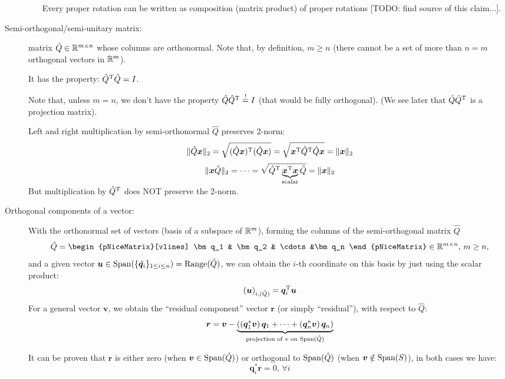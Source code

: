 \documentclass[
  12pt,
  paper=a4,
]{scrartcl} %
\begin{document}
\begin{description}
\begin{itemize}
    Every proper rotation can be written as composition (matrix product) of proper rotations [TODO: find source of this claim...].

\end{itemize}

\item[Semi-orthogonal/semi-unitary matrix:] matrix $\hat Q \in \mathbb R^{m\times n}$ whose columns are orthonormal. Note that, by definition, $m \ge n$ (there cannot be a set of more than $n=m$ orthogonal vectors in $\mathbb R^m$).

It has the property: $\hat Q^{\mathrm{T}} \hat Q = I$.

Note that, unless $m=n$, we don't have the property $\hat Q \hat Q^{\mathrm{T}}  \overset{!}{=} I$ (that would be fully orthogonal). (We see later that $\hat Q \hat Q^{\mathrm{T}}$ is a projection matrix).

Left and right multiplication by semi-orthonormal $\hat Q$ preserves 2-norm:
\[
    \|\hat Q \bm x\|_2=
    \sqrt{(\hat Q \bm x)^{\mathrm{T}} (\hat Q \bm x)}=
    \sqrt{\bm x^{\mathrm{T}} \hat Q^{\mathrm{T}} \hat Q \bm x}=
    \|\bm x\|_2
\]
\[
    \| \bm x \hat Q\|_2=
    \cdots =
    \sqrt{\smash[b]{{\hat Q^{\mathrm{T}} \underbrace{\bm x^{\mathrm{T}}\bm x}_{\text{scalar}} \hat Q}}}
    =\|\bm x\|_2
\]\vspace{0.01em} %

But multiplication by $\hat Q^{\mathrm{T}}$ does NOT preserve the 2-norm.



\item[Orthogonal components of a vector:] 
With the orthonormal set of vectors (basis of a subspace of $\mathbb R^m$), forming the columns of the semi-orthogonal matrix $\hat Q$ \[
\hat Q=
\begin{pNiceMatrix}[vlines]
    \bm q_1 & \bm q_2 & \cdots &\bm q_n
\end{pNiceMatrix}
\in \RR^{m\times n}, \, m\ge n
,\] and a given vector $\bm u \in \operatorname{Span}(\{\hat{\bm q_i}\}_{1\le i\le n} ) = \operatorname{Range}(\hat Q)$, we can obtain the $i$-th coordinate on this basis by just using the scalar product:
\[
    (\bm u)_{i,(\hat Q)} = \bm q_i^{\mathrm{T}} \bm u
\]
For a general vector $\bm v$,  we obtain the ``residual component'' vector $\bm r$ (or simply ``residual''), with respect to $\hat Q$:
\[
    \bm r = \bm v - 
    \underbrace{\left(
        (\bm q_1^* \bm v)\, \bm q_1 + \cdots+
        (\bm q_n^* \bm v)\, \bm q_n
    \right)}_\text{projection of $v$ on $\operatorname{Span}(\hat Q)$}
\]

It can be proven that $\bm r$ is either zero (when $\bm v\in \operatorname{Span}(\hat Q)$) or orthogonal to $\operatorname{Span}(\hat Q)$ (when $\bm v\notin \operatorname{Span}(S)$), in both cases we have: \[\bm q_i^* \bm r = 0, \, \forall i\]


\end{description}
\end{document}
